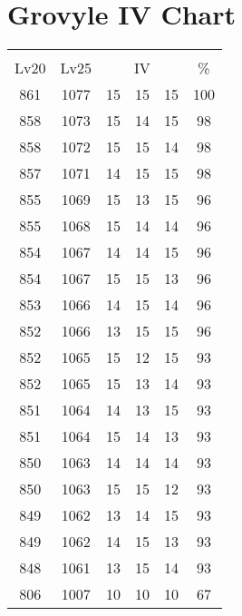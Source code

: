 \documentclass{article}%
\begin{document}
%
\normalsize%
\section{Grovyle IV Chart}%
\label{sec:Grovyle IV Chart}%
\renewcommand{\arraystretch}{1.5}%
\begin{tabular}{|c|c|c|c|c|c|}%
\hline%
\multicolumn{6}{|c|}{\textcolor{white}{ 
\linebreak{Grovyle}
}%
\cellcolor{black}}\\%
\multicolumn{1}{|c}{Lv20}&\multicolumn{1}{c|}{Lv25}&\multicolumn{3}{c|}{IV}&\multicolumn{1}{|c|}{\%}\\%
\hline%
\rowcolor{color100}%
861&1077&15&15&15&100\\%
\hline%
\rowcolor{color98}%
858&1073&15&14&15&98\\%
\hline%
\rowcolor{color98}%
858&1072&15&15&14&98\\%
\hline%
\rowcolor{color98}%
857&1071&14&15&15&98\\%
\hline%
\rowcolor{color96}%
855&1069&15&13&15&96\\%
\hline%
\rowcolor{color96}%
855&1068&15&14&14&96\\%
\hline%
\rowcolor{color96}%
854&1067&14&14&15&96\\%
\hline%
\rowcolor{color96}%
854&1067&15&15&13&96\\%
\hline%
\rowcolor{color96}%
853&1066&14&15&14&96\\%
\hline%
\rowcolor{color96}%
852&1066&13&15&15&96\\%
\hline%
\rowcolor{color93}%
852&1065&15&12&15&93\\%
\hline%
\rowcolor{color93}%
852&1065&15&13&14&93\\%
\hline%
\rowcolor{color93}%
851&1064&14&13&15&93\\%
\hline%
\rowcolor{color93}%
851&1064&15&14&13&93\\%
\hline%
\rowcolor{color93}%
850&1063&14&14&14&93\\%
\hline%
\rowcolor{color93}%
850&1063&15&15&12&93\\%
\hline%
\rowcolor{color93}%
849&1062&13&14&15&93\\%
\hline%
\rowcolor{color93}%
849&1062&14&15&13&93\\%
\hline%
\rowcolor{color93}%
848&1061&13&15&14&93\\%
\hline%
\rowcolor{color91}%
806&1007&10&10&10&67\\%
\end{tabular}

%
\end{document}
